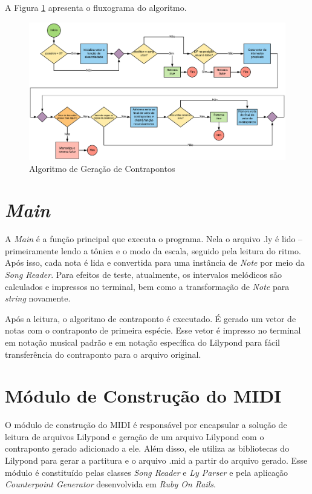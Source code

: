     A Figura \ref{algoritmo} apresenta o fluxograma do algoritmo.

    \begin{figure}[htb]
      \centering
      \includegraphics[scale=0.6]{figuras/algoritmo.eps}
      \caption{Algoritmo de Geração de Contrapontos}
      \label{algoritmo}
    \end{figure}


  \section[\textit{Main}]{\textit{Main}}

    A \textit{Main} é a função principal que executa o programa. Nela o arquivo .ly é lido -- primeiramente lendo a tônica e o modo da escala, seguido pela leitura do ritmo. Após isso, cada nota é lida e convertida para uma instância de \textit{Note} por meio da \textit{Song Reader}. Para efeitos de teste, atualmente, os intervalos melódicos são calculados e impressos no terminal, bem como a transformação de \textit{Note} para \textit{string} novamente.

    Após a leitura, o algoritmo de contraponto é executado. É gerado um vetor de notas com o contraponto de primeira espécie. Esse vetor é impresso no terminal em notação musical padrão e em notação específica do Lilypond para fácil transferência do contraponto para o arquivo original.

  \section[Módulo de Construção do MIDI]{Módulo de Construção do MIDI}

    O módulo de construção do MIDI é responsável por encapsular a solução de leitura de arquivos Lilypond e geração de um arquivo Lilypond com o contraponto gerado adicionado a ele. Além disso, ele utiliza as bibliotecas do Lilypond para gerar a partitura e o arquivo .mid a partir do arquivo gerado. Esse módulo é constituído pelas classes \textit{Song Reader} e \textit{Ly Parser} e pela aplicação \textit{Counterpoint Generator} desenvolvida em \textit{Ruby On Rails}.

